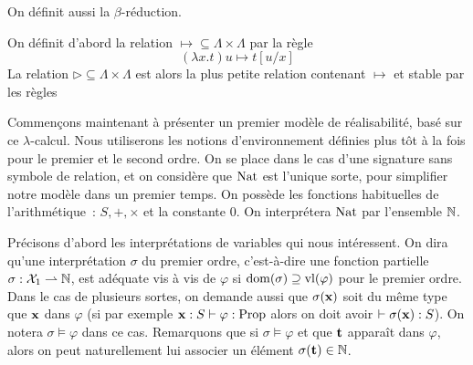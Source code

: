 \documentclass{article}
\begin{document}
On définit aussi la $\beta$-réduction.

\begin{defi}
    On définit d'abord la relation $\mapsto\subseteq \Lambda\times\Lambda$ par la règle
    \[(\lambda x.t)u \mapsto t[u/x]\]
    La relation $\rhd\subseteq \Lambda\times\Lambda$ est alors la plus petite relation contenant $\mapsto$ et stable par les règles
    \begin{center}
        \begin{prooftree}
        \end{prooftree}
        \quad
        \begin{prooftree}
        \end{prooftree}
        \quad
        \begin{prooftree}
        \end{prooftree}
    \end{center}
\end{defi}
Commençons maintenant à présenter un premier modèle de réalisabilité, basé sur ce $\lambda$-calcul. Nous utiliserons les notions d'environnement définies plus tôt à la fois pour le premier et le second ordre. On se place dans le cas d'une signature sans symbole de relation, et on considère que $\Nat$ est l'unique sorte, pour simplifier notre modèle dans un premier temps. On possède les fonctions habituelles de l'arithmétique~: $S,+,\times$ et la constante $0$. On interprétera $\Nat$ par l'ensemble $\bN$.

Précisons d'abord les interprétations de variables qui nous intéressent. On dira qu'une interprétation $\sigma$ du premier ordre, c'est-à-dire une fonction partielle $\sigma : \mathcal X_1 \rightharpoonup \bN$, est adéquate vis à vis de $\varphi$ si $\domm(\sigma) \supseteq\varlib{\varphi}$ pour le premier ordre. Dans le cas de plusieurs sortes, on demande aussi que $\sigma(\bx)$ soit du même type que $\bx$ dans $\varphi$ (si par exemple $\bx : S \vdash \varphi : \Propo$ alors on doit avoir $\vdash \sigma(\bx) : S$). On notera $\sigma\models \varphi$ dans ce cas. Remarquons que si $\sigma \models \varphi$ et que $\bt$ apparaît dans $\varphi$, alors on peut naturellement lui associer un élément $\sigma(\bt) \in \bN$.
\end{document}
